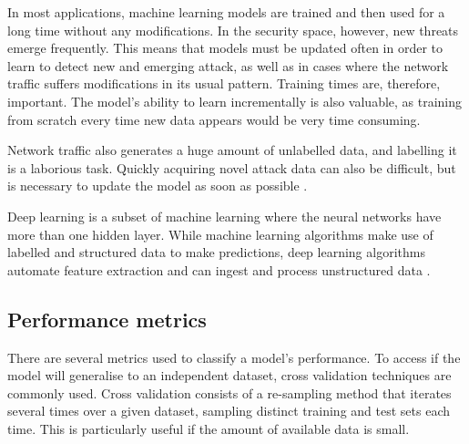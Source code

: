 In most applications, machine learning models are trained and then used for a long time without any modifications. In the security space, however, new threats emerge frequently. This means that models must be updated often in order to learn to detect new and emerging attack, as well as in cases where the network traffic suffers modifications in its usual pattern. Training times are, therefore, important. The model's ability to learn incrementally is also valuable, as training from scratch every time new data appears would be very time consuming.\par
Network traffic also generates a huge amount of unlabelled data, and labelling it is a laborious task. Quickly acquiring novel attack data can also be difficult, but is necessary to update the model as soon as possible \citep{Buczak2016}.\par
Deep learning is a subset of machine learning where the neural networks have more than one hidden layer. While machine learning algorithms make use of labelled and structured data to make predictions, deep learning algorithms automate feature extraction and can ingest and process unstructured data \citep{ibmDeepLearning}.

\subsection{Performance metrics}

There are several metrics used to classify a model's performance. To access if the model will generalise to an independent dataset, cross validation techniques are commonly used. Cross validation consists of a re-sampling method that iterates several times over a given dataset, sampling distinct training and test sets each time. This is particularly useful if the amount of available data is small.\par

